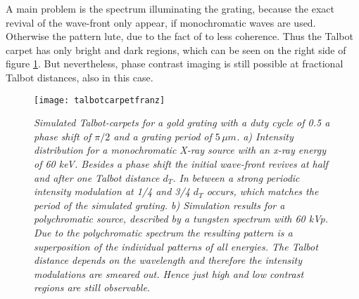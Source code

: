A main problem is the spectrum illuminating the grating, because the exact revival of the wave-front only appear, if monochromatic waves are used. Otherwise the pattern lute, due to the fact of to less coherence. Thus the Talbot carpet has only bright and dark regions, which can be seen on the right side of figure \ref{talcarp}. But nevertheless, phase contrast imaging is still possible at fractional Talbot distances, also in this case.
\begin{figure}[h]
	\begin{center}
		\texttt{[image: talbotcarpetfranz]}
	\end{center}
	\caption[Simulated Talbot-carpets for a grating with a duty cycle of 0.5 a phase shift of $\pi/2$ and a grating period of $5\, \mu m$.]{\textit{Simulated Talbot-carpets for a gold grating with a duty cycle of 0.5 a phase shift of $\pi/2$ and a grating period of $5\, \mu m$. a) Intensity distribution for a monochromatic X-ray source with an x-ray energy of 60 keV. Besides a phase shift the initial wave-front revives at half and after one Talbot distance $d_{T}$. In between a strong periodic intensity modulation at 1/4 and 3/4 $d_{T}$ occurs, which matches the period of the simulated grating. b) Simulation results for a polychromatic source, described by a tungsten spectrum with 60 kVp. Due to the polychromatic spectrum the resulting pattern is a superposition of the individual patterns of all energies. The Talbot distance depends on the wavelength and therefore the intensity modulations are smeared out. Hence just high and low contrast regions are still observable.}}
	\label{talcarp}
\end{figure}
